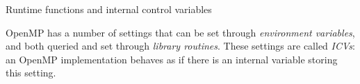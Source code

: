 







 {Runtime functions and internal control variables}
\label{ref:omp-environ}

OpenMP has a number of settings that can be set through \emph{environment variables},
and both queried and set through \emph{library routines}. These settings are called
\emph{\acfp{ICV}}: an OpenMP implementation behaves as if there is an internal variable
storing this setting.

